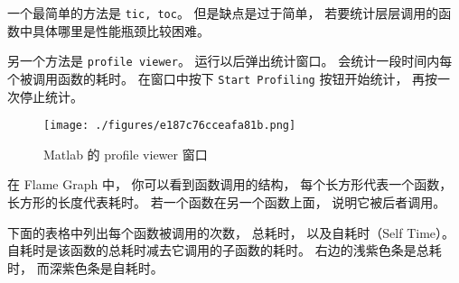 
\begin{issues}
\issueDraft
\end{issues}


一个最简单的方法是 \verb`tic, toc`。 但是缺点是过于简单， 若要统计层层调用的函数中具体哪里是性能瓶颈比较困难。

另一个方法是 \verb`profile viewer`。 运行以后弹出统计窗口。 会统计一段时间内每个被调用函数的耗时。 在窗口中按下 \verb`Start Profiling` 按钮开始统计， 再按一次停止统计。

\begin{figure}[ht]
\centering
\texttt{[image: ./figures/e187c76cceafa81b.png]}
\caption{Matlab 的 profile viewer 窗口} \label{fig_MLprof_1}
\end{figure}

在 Flame Graph 中， 你可以看到函数调用的结构， 每个长方形代表一个函数， 长方形的长度代表耗时。 若一个函数在另一个函数上面， 说明它被后者调用。

下面的表格中列出每个函数被调用的次数， 总耗时， 以及自耗时（Self Time）。 自耗时是该函数的总耗时减去它调用的子函数的耗时。 右边的浅紫色条是总耗时， 而深紫色条是自耗时。
